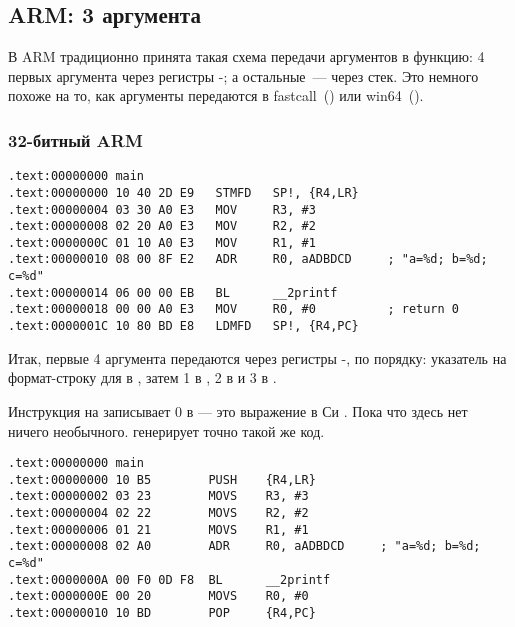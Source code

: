 \subsection{ARM: 3 аргумента}

В ARM традиционно принята такая схема передачи аргументов в функцию: 
4 первых аргумента через регистры -; а остальные~--- через стек.
Это немного похоже на то, как аргументы передаются в 
fastcall~() или win64~().

\subsubsection{32-битный ARM}

\myparagraph{\NonOptimizingKeilVI (\ARMMode)}

\begin{lstlisting}[caption=\NonOptimizingKeilVI (\ARMMode)]
.text:00000000 main
.text:00000000 10 40 2D E9   STMFD   SP!, {R4,LR}
.text:00000004 03 30 A0 E3   MOV     R3, #3
.text:00000008 02 20 A0 E3   MOV     R2, #2
.text:0000000C 01 10 A0 E3   MOV     R1, #1
.text:00000010 08 00 8F E2   ADR     R0, aADBDCD     ; "a=%d; b=%d; c=%d"
.text:00000014 06 00 00 EB   BL      __2printf
.text:00000018 00 00 A0 E3   MOV     R0, #0          ; return 0
.text:0000001C 10 80 BD E8   LDMFD   SP!, {R4,PC}
\end{lstlisting}

Итак, первые 4 аргумента передаются через регистры -, по порядку: 
указатель на формат-строку для \printf
в , затем 1 в , 2 в  и 3 в .

Инструкция на  записывает 0 в  --- это выражение в Си .
Пока что здесь нет ничего необычного.
\OptimizingKeilVI генерирует точно такой же код.

\myparagraph{\OptimizingKeilVI (\ThumbMode)}

\begin{lstlisting}[caption=\OptimizingKeilVI (\ThumbMode)]
.text:00000000 main
.text:00000000 10 B5        PUSH    {R4,LR}
.text:00000002 03 23        MOVS    R3, #3
.text:00000004 02 22        MOVS    R2, #2
.text:00000006 01 21        MOVS    R1, #1
.text:00000008 02 A0        ADR     R0, aADBDCD     ; "a=%d; b=%d; c=%d"
.text:0000000A 00 F0 0D F8  BL      __2printf
.text:0000000E 00 20        MOVS    R0, #0
.text:00000010 10 BD        POP     {R4,PC}
\end{lstlisting}

